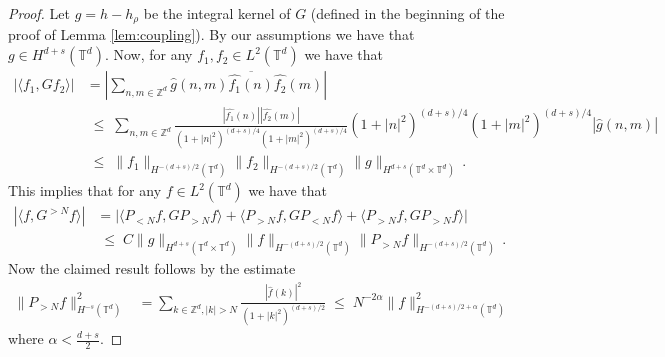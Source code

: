 \documentclass[11pt]{article}
\numberwithin{equation}{section}
\theoremstyle{definition}
\renewcommand{\leq}{\;\leqslant\;}                   %
\newcommand{\Z}{\mathbb{Z}}
\def\T{\mathbb{T}}
\newcommand{\PN}{ {P_{< N}} }
\newcommand{\PNN}{ {P_{>N}} }
\newcommand{\F}[1]{ { \hat{#1} } }
\begin{document}
\begin{proof} Let $g = h-h_\rho$ be the integral kernel of $G$ (defined in the beginning of the proof of Lemma \ref{lem:coupling}). By our assumptions we have that $g \in H^{d+s}(\T^d)$. Now, for any $f_1, f_2 \in L^2(\T^d)$ we have that 
\begin{align*}
|\langle f_1, G f_2 \rangle| &= \left| \sum_{n,m \in \Z^d} \F{g}(n,m) \overline{\F{f_1}(n)} \F{f_2}(m)  \right| \\
&\leq \sum_{n,m \in \Z^d} \frac{| \F{f_1}(n)| |\F{f_2}(m)|}{(1+|n|^2)^{(d+s)/4} (1+|m|^2)^{(d+s)/4}}  (1+|n|^2)^{(d+s)/4}  (1+|m|^2)^{(d+s)/4} |\F{g}(n,m)| \\
& \leq  \|f_1\|_{H^{-(d+s)/2}(\T^d)} \|f_2\|_{H^{-(d+s)/2}(\T^d)} \|g\|_{H^{d+s}(\T^d \times \T^d)}\,.
\end{align*}
This implies that for any $f \in L^2(\T^d)$ we have that 
\begin{align*}
|\langle f, G^{>N} f \rangle| &= \big| \langle \PN f, G \PNN f \rangle  + \langle \PNN f, G \PN f \rangle + \langle \PNN f , G \PNN f \rangle \big| \\
& \leq C \|g\|_{H^{d+s}(\T^d \times \T^d)} \|f\|_{H^{-(d+s)/2}(\T^d)} \|\PNN f\|_{H^{-(d+s)/2}(\T^d)} \,.
\end{align*}
Now the claimed result follows by the estimate
\begin{align*}
\|\PNN f \|_{H^{-s}(\T^d)}^2 &= \sum_{k \in \Z^d, |k|>N} \frac{|\F{f}(k)|^2}{(1+|k|^2)^{(d+s)/2}} \leq N^{-2\alpha} \|f\|_{H^{-(d+s)/2+\alpha}(\T^d)}^2
\end{align*}
where $\alpha < \frac{d+s}{2}$.
\end{proof}
\end{document}
